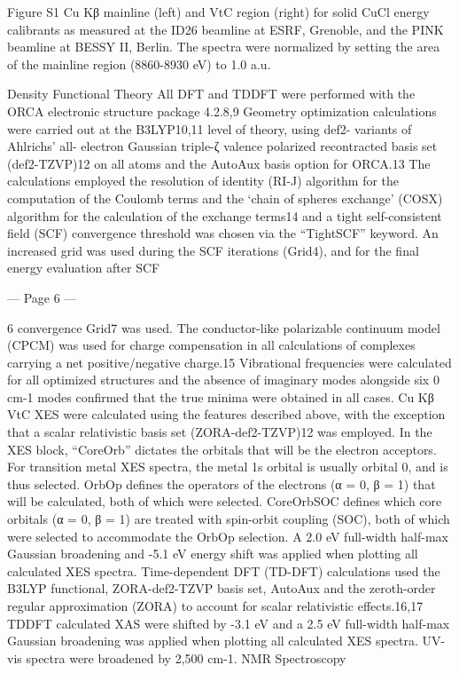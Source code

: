 Figure S1 Cu Kβ mainline (left) and VtC region (right) for solid CuCl energy calibrants as measured at the ID26 
beamline at ESRF, Grenoble, and the PINK beamline at BESSY II, Berlin. The spectra were normalized by setting 
the area of the mainline region (8860-8930 eV) to 1.0 a.u. 
 
Density Functional Theory 
All DFT and TDDFT were performed with the ORCA electronic structure package 4.2.8,9 Geometry 
optimization calculations were carried out at the B3LYP10,11 level of theory, using def2- variants of Ahlrichs’ all-
electron Gaussian triple-ζ valence polarized recontracted basis set (def2-TZVP)12 on all atoms and the AutoAux 
basis option for ORCA.13 The calculations employed the resolution of identity (RI-J) algorithm for the computation 
of the Coulomb terms and the ‘chain of spheres exchange’ (COSX) algorithm for the calculation of the exchange 
terms14 and a tight self-consistent field (SCF) convergence threshold was chosen via the “TightSCF” keyword. 
An increased grid was used during the SCF iterations (Grid4), and for the final energy evaluation after SCF 


--- Page 6 ---
 
6 
convergence Grid7 was used. The conductor-like polarizable continuum model (CPCM) was used for charge 
compensation in all calculations of complexes carrying a net positive/negative charge.15 Vibrational frequencies 
were calculated for all optimized structures and the absence of imaginary modes alongside six 0 cm-1 modes 
confirmed that the true minima were obtained in all cases.  
Cu Kβ VtC XES were calculated using the features described above, with the exception that a scalar 
relativistic basis set (ZORA-def2-TZVP)12 was employed. In the XES block, “CoreOrb” dictates the orbitals that 
will be the electron acceptors. For transition metal XES spectra, the metal 1s orbital is usually orbital 0, and is 
thus selected. OrbOp defines the operators of the electrons (α = 0, β = 1) that will be calculated, both of which 
were selected. CoreOrbSOC defines which core orbitals (α = 0, β = 1) are treated with spin-orbit coupling (SOC), 
both of which were selected to accommodate the OrbOp selection. A 2.0 eV full-width half-max Gaussian 
broadening and -5.1 eV energy shift was applied when plotting all calculated XES spectra.  
Time-dependent DFT (TD-DFT) calculations used the B3LYP functional, ZORA-def2-TZVP basis set, 
AutoAux and the zeroth-order regular approximation (ZORA) to account for scalar relativistic effects.16,17 TDDFT 
calculated XAS were shifted by -3.1 eV and a 2.5 eV full-width half-max Gaussian broadening was applied when 
plotting all calculated XES spectra. UV-vis spectra were broadened by 2,500 cm-1. 
NMR Spectroscopy 
 
